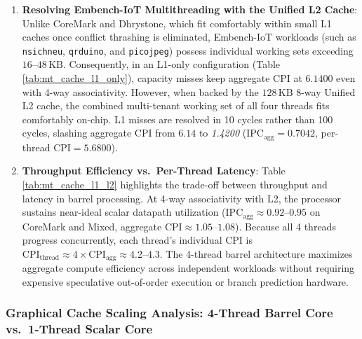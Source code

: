\begin{enumerate}
\begin{itemize}
        \item On Dhrystone, I-Cache misses drop from $6,835$ down to \textit{only 143} ($0.37\%$ miss rate), restoring aggregate CPI to $\mathbf{1.6891}$ (with L2), a \textit{5.91$\times$ speedup}.
        \item On Embench-IoT, inter-thread conflict thrashing is completely eliminated; with L2, aggregate CPI drops to \textit{1.4200}, delivering a \textit{5.27$\times$ speedup} over direct mapping.
    \end{itemize}
    This demonstrates that \textit{setting cache associativity equal to the thread count ($W \ge N_{\text{threads}}$) is the definitive architectural requirement to eliminate inter-thread conflict thrashing}.
    \item \textbf{Resolving Embench-IoT Multithreading with the Unified L2 Cache}:
    Unlike CoreMark and Dhrystone, which fit comfortably within small L1 caches once conflict thrashing is eliminated, Embench-IoT workloads (such as \texttt{nsichneu}, \texttt{qrduino}, and \texttt{picojpeg}) possess individual working sets exceeding $16\text{--}48\,\text{KB}$. Consequently, in an L1-only configuration (Table \ref{tab:mt_cache_l1_only}), capacity misses keep aggregate CPI at $\mathbf{6.1400}$ even with 4-way associativity. 
    However, when backed by the $128\,\text{KB}$ 8-way Unified L2 cache, the combined multi-tenant working set of all four threads fits comfortably on-chip. L1 misses are resolved in 10 cycles rather than 100 cycles, slashing aggregate CPI from $6.14$ to \textit{1.4200} ($\text{IPC}_{\text{agg}} = 0.7042$, per-thread $\text{CPI} = 5.6800$).
    \item \textbf{Throughput Efficiency vs.\ Per-Thread Latency}:
    Table \ref{tab:mt_cache_l1_l2} highlights the trade-off between throughput and latency in barrel processing. At 4-way associativity with L2, the processor sustains near-ideal scalar datapath utilization ($\text{IPC}_{\text{agg}} \approx 0.92\text{--}0.95$ on CoreMark and Mixed, aggregate $\text{CPI} \approx 1.05\text{--}1.08$). Because all 4 threads progress concurrently, each thread's individual CPI is $\text{CPI}_{\text{thread}} \approx 4 \times \text{CPI}_{\text{agg}} \approx 4.2\text{--}4.3$. The 4-thread barrel architecture maximizes aggregate compute efficiency across independent workloads without requiring expensive speculative out-of-order execution or branch prediction hardware.
\end{enumerate}


\subsubsection{Graphical Cache Scaling Analysis: 4-Thread Barrel Core vs.\ 1-Thread Scalar Core}

